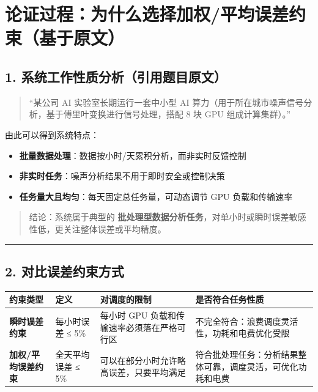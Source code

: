 \documentclass[
]{article}
\author{}
\date{}
\begin{document}
\section{论证过程：为什么选择加权/平均误差约束（基于原文）}\label{ux8bbaux8bc1ux8fc7ux7a0bux4e3aux4ec0ux4e48ux9009ux62e9ux52a0ux6743ux5e73ux5747ux8befux5deeux7ea6ux675fux57faux4e8eux539fux6587uxff09}

\subsection{1.
系统工作性质分析（引用题目原文）}\label{1-ux7cfbux7edfux5de5ux4f5cux6027ux8d28ux5206ux6790ux5f15ux7528ux9898ux76eeux539fux6587uxff09}

\begin{quote}
``某公司 AI 实验室长期运行一套中小型 AI
算力（用于所在城市噪声信号分析，基于傅里叶变换进行信号处理，搭配 8 块
GPU 组成计算集群）。''
\end{quote}

由此可以得到系统特点：

\begin{itemize}
\item
  \textbf{批量数据处理}：数据按小时/天累积分析，而非实时反馈控制
\item
  \textbf{非实时任务}：噪声分析结果不用于即时安全或控制决策
\item
  \textbf{任务量大且均匀}：每天固定总任务量，可动态调节 GPU
  负载和传输速率
\end{itemize}

\begin{quote}
结论：系统属于典型的
\textbf{批处理型数据分析任务}，对单小时或瞬时误差敏感性低，更关注整体误差或平均精度。
\end{quote}

\begin{center}\rule{0.5\linewidth}{0.5pt}\end{center}

\subsection{2.
对比误差约束方式}\label{2-ux5bf9ux6bd4ux8befux5deeux7ea6ux675fux65b9ux5f0f}

\begin{longtable}[]{@{}llll@{}}
\toprule\noalign{}
约束类型 & 定义 & 对调度的限制 & 是否符合任务性质 \\
\midrule\noalign{}
\endhead
\bottomrule\noalign{}
\endlastfoot
\textbf{瞬时误差约束} & 每小时误差 ≤ 5\% & 每小时 GPU
负载和传输速率必须落在严格可行区 &
不完全符合：浪费调度灵活性，功耗和电费优化受限 \\
\textbf{加权/平均误差约束} & 全天平均误差 ≤ 5\% &
可以在部分小时允许略高误差，只要平均满足 &
符合批处理任务：分析结果整体可靠，调度灵活，可优化功耗和电费 \\
\end{longtable}
\end{document}
